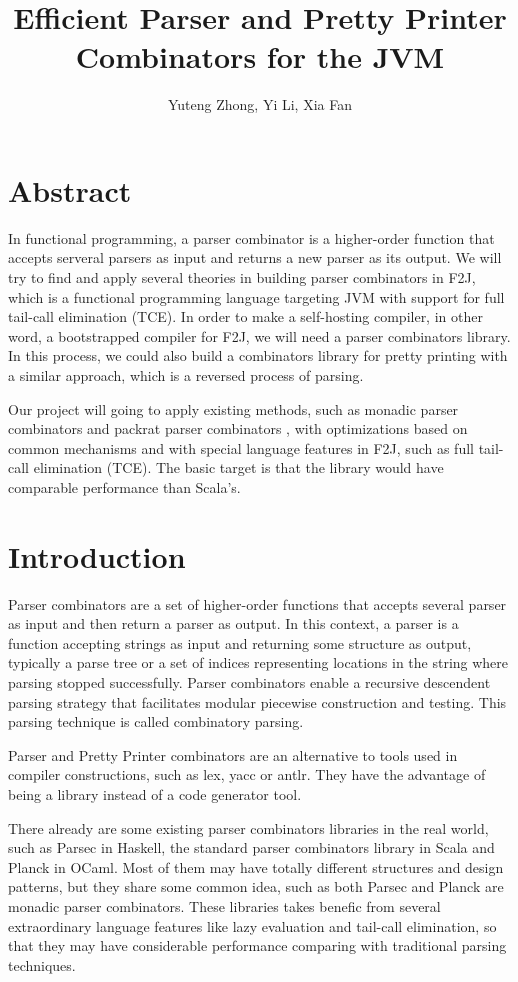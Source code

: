 \documentclass[9pt,a4paper,twocolumn]{article}
\title{Efficient Parser and Pretty Printer Combinators for the JVM}
\author{Yuteng Zhong, Yi Li, Xia Fan}
\begin{document}
\maketitle

\section{Abstract}

In functional programming, a parser combinator is a higher-order function that accepts serveral parsers as input and returns a new parser as its output. We will try to find and apply several theories in building parser combinators in F2J, which is a functional programming language targeting JVM with support for full tail-call elimination (TCE). In order to make a self-hosting compiler, in other word, a bootstrapped compiler for F2J, we will need a parser combinators library. In this process, we could also build a combinators library for pretty printing with a similar approach, which is a reversed process of parsing.

Our project will going to apply existing methods, such as monadic parser combinators \cite{Hutton:1996} and packrat parser combinators \cite{Ford2002}, with optimizations based on common mechanisms and with special language features in F2J, such as full tail-call elimination (TCE). The basic target is that the library would have comparable performance than Scala's.

\section{Introduction}

Parser combinators are a set of higher-order functions that accepts several parser as input and then return a parser as output. In this context, a parser is a function accepting strings as input and returning some structure as output, typically a parse tree or a set of indices representing locations in the string where parsing stopped successfully. Parser combinators enable a recursive descendent parsing strategy that facilitates modular piecewise construction and testing. This parsing technique is called combinatory parsing.

Parser and Pretty Printer combinators are an alternative to tools used in compiler constructions, such as lex, yacc or antlr. They have the advantage of being a library instead of a code generator tool.

There already are some existing parser combinators libraries in the real world, such as Parsec \cite{Leijen:2002} in Haskell, the standard parser combinators library in Scala and Planck \cite{Planck} in OCaml. Most of them may have totally different structures and design patterns, but they share some common idea, such as both Parsec and Planck are monadic parser combinators. These libraries takes benefic from several extraordinary language features like lazy evaluation and tail-call elimination, so that they may have considerable performance comparing with traditional parsing techniques.
\end{document}
